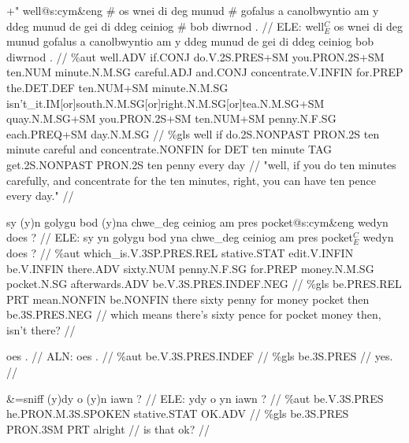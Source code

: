 \documentclass[a4paper,10pt]{article}
\begin{document}
\ex
\begingl[lingstyle=gergl]
\glchat +" well@s:cym\&eng \# os wnei di deg munud \# gofalus a canolbwyntio am y ddeg munud de gei di ddeg ceiniog \# bob diwrnod . //
\glsurface ELE:  well$^{C}_{E}$ os wnei di deg munud gofalus a canolbwyntio am y ddeg munud de gei di ddeg ceiniog bob diwrnod .  //
\glauto \%aut  well{\scriptsize .ADV} if{\scriptsize .CONJ} do{\scriptsize .V.2S.PRES+SM} you{\scriptsize .PRON.2S+SM} ten{\scriptsize .NUM} minute{\scriptsize .N.M.SG} careful{\scriptsize .ADJ} and{\scriptsize .CONJ} concentrate{\scriptsize .V.INFIN} for{\scriptsize .PREP} the{\scriptsize .DET.DEF} ten{\scriptsize .NUM+SM} minute{\scriptsize .N.M.SG} isn't\_it{\scriptsize .IM[or]south.N.M.SG[or]right.N.M.SG[or]tea.N.M.SG+SM} quay{\scriptsize .N.M.SG+SM} you{\scriptsize .PRON.2S+SM} ten{\scriptsize .NUM+SM} penny{\scriptsize .N.F.SG} each{\scriptsize .PREQ+SM} day{\scriptsize .N.M.SG}   //
\glmanual \%gls  well if do{\scriptsize .2S.NONPAST} PRON{\scriptsize .2S} ten minute careful and concentrate{\scriptsize .NONFIN} for DET ten minute TAG get{\scriptsize .2S.NONPAST} PRON{\scriptsize .2S} ten penny every day   //
\gleng "well, if you do ten minutes carefully, and concentrate for the ten minutes, right, you can have ten pence every day." //
\endgl
\xe

\ex
\begingl[lingstyle=gergl]
\glchat sy (y)n golygu bod (y)na chwe\_deg ceiniog am pres pocket@s:cym\&eng wedyn does ? //
\glsurface ELE:  sy yn golygu bod yna chwe\_deg ceiniog am pres pocket$^{C}_{E}$ wedyn does ?  //
\glauto \%aut  which\_is{\scriptsize .V.3SP.PRES.REL} stative{\scriptsize .STAT} edit{\scriptsize .V.INFIN} be{\scriptsize .V.INFIN} there{\scriptsize .ADV} sixty{\scriptsize .NUM} penny{\scriptsize .N.F.SG} for{\scriptsize .PREP} money{\scriptsize .N.M.SG} pocket{\scriptsize .N.SG} afterwards{\scriptsize .ADV} be{\scriptsize .V.3S.PRES.INDEF.NEG}   //
\glmanual \%gls  be{\scriptsize .PRES.REL} PRT mean{\scriptsize .NONFIN} be{\scriptsize .NONFIN} there sixty penny for money pocket then be{\scriptsize .3S.PRES.NEG}   //
\gleng which means there's sixty pence for pocket money then, isn't there? //
\endgl
\xe

\ex
\begingl[lingstyle=gergl]
\glchat oes . //
\glsurface ALN:  oes .  //
\glauto \%aut  be{\scriptsize .V.3S.PRES.INDEF}   //
\glmanual \%gls  be{\scriptsize .3S.PRES}   //
\gleng yes. //
\endgl
\xe

\ex
\begingl[lingstyle=gergl]
\glchat \&=sniff (y)dy o (y)n iawn ? //
\glsurface ELE:  ydy o yn iawn ?  //
\glauto \%aut  be{\scriptsize .V.3S.PRES} he{\scriptsize .PRON.M.3S.SPOKEN} stative{\scriptsize .STAT} OK{\scriptsize .ADV}   //
\glmanual \%gls  be{\scriptsize .3S.PRES} PRON{\scriptsize .3SM} PRT alright   //
\gleng is that ok? //
\endgl
\xe
\end{document}
